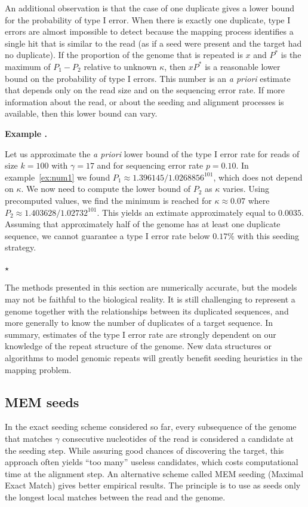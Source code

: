 \documentclass{article}
\newcounter{examplecounter}
\newenvironment{example}
{\small\vspace{0.5\baselineskip}
  \refstepcounter{examplecounter}%
  \noindent\textbf{Example \arabic{examplecounter}.}%
}{\vspace{-0.2\baselineskip}\begin{center}%
  $\star$\end{center}\vspace{0.5\baselineskip}}
\begin{document}
An additional observation is that the case of one duplicate gives a lower
bound for the probability of type I error. When there is exactly one
duplicate, type I errors are almost impossible to detect because the
mapping process identifies a single hit that is similar to the read (as if
a seed were present and the target had no duplicate). If the proportion of
the genome that is repeated is $x$ and $P^*$ is the maximum of $P_1-P_2$
relative to unknown $\kappa$, then $xP^*$ is a reasonable lower bound on
the probability of type I errors. This number is an \textit{a priori}
estimate that depends only on the read size and on the sequencing error
rate. If more information about the read, or about the seeding and
alignment processes is available, then this lower bound can vary.


\begin{example}
Let us approximate the \textit{a priori} lower bound of the type I error
rate for reads of size $k=100$ with $\gamma=17$ and for sequencing error
rate $p=0.10$. In example~\ref{ex:num1} we found $P_1 \approx 1.396145 /
1.0268856^{101}$, which does not depend on $\kappa$. We now need to
compute the lower bound of $P_2$ as $\kappa$ varies. Using precomputed
values, we find the minimum is reached for $\kappa \approx 0.07$ where
$P_2 \approx 1.403628/1.02732^{101}$. This yields an extimate
approximately equal to $0.0035$. Assuming that approximately half of the
genome has at least one duplicate sequence, we cannot guarantee a type I
error rate below $0.17\%$ with this seeding strategy.
\end{example}

The methods presented in this section are numerically accurate, but the
models may not be faithful to the biological reality. It is still
challenging to represent a genome together with the relationships between
its duplicated sequences, and more generally to know the number of
duplicates of a target sequence. In summary, estimates of the type
I error rate are strongly dependent on our knowledge of the repeat
structure of the genome. New data structures or algorithms to model
genomic repeats will greatly benefit seeding heuristics in the mapping
problem.




\subsection{MEM seeds}

In the exact seeding scheme considered so far, every subsequence of the
genome that matches $\gamma$ consecutive nucleotides of the read is
considered a candidate at the seeding step. While assuring good chances of
discovering the target, this approach often yields ``too many'' useless
candidates, which costs computational time at the alignment step. An
alternative scheme called MEM seeding (Maximal Exact Match) gives better
empirical results. The principle is to use as seeds only the longest local
matches between the read and the genome.
\end{document}

